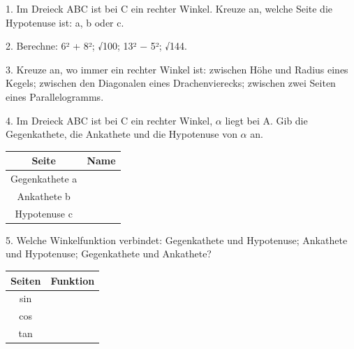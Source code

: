 \documentclass[11pt]{article}
\begin{document}
\pfheftstil
{}
\pfrueckblick
\begin{pfaufg}{}{1.}{}
Im Dreieck ABC ist bei C ein rechter Winkel. Kreuze an, welche Seite die Hypotenuse ist: a, b oder c.
\end{pfaufg}
\begin{pfaufg}{}{2.}{}
Berechne: 6² + 8²; √100; 13² $-$ 5²; √144.
\end{pfaufg}
\begin{pfaufg}{}{3.}{}
Kreuze an, wo immer ein rechter Winkel ist: zwischen Höhe und Radius eines Kegels; zwischen den Diagonalen eines Drachenvierecks; zwischen zwei Seiten eines Parallelogramms.
\end{pfaufg}
\begin{pfaufg}{}{4.}{}
Im Dreieck ABC ist bei C ein rechter Winkel, $\alpha$ liegt bei A. Gib die Gegenkathete, die Ankathete und die Hypotenuse von $\alpha$ an.
\par\smallskip\noindent \begingroup\renewcommand{\arraystretch}{1.3}\begin{tabular}{|c|c|}\hline \textbf{Seite} & \textbf{Name} \\ \hline Gegenkathete a & \rule{0pt}{3ex}\hspace{1.6cm} \\ \hline Ankathete b & \rule{0pt}{3ex}\hspace{1.6cm} \\ \hline Hypotenuse c & \rule{0pt}{3ex}\hspace{1.6cm} \\ \hline\end{tabular}\endgroup\par
{}
\end{pfaufg}
\begin{pfaufg}{}{5.}{}
Welche Winkelfunktion verbindet: Gegenkathete und Hypotenuse; Ankathete und Hypotenuse; Gegenkathete und Ankathete?
\par\smallskip\noindent \begingroup\renewcommand{\arraystretch}{1.3}\begin{tabular}{|c|c|}\hline \textbf{Seiten} & \textbf{Funktion} \\ \hline sin & \rule{0pt}{3ex}\hspace{1.6cm} \\ \hline cos & \rule{0pt}{3ex}\hspace{1.6cm} \\ \hline tan & \rule{0pt}{3ex}\hspace{1.6cm} \\ \hline\end{tabular}\endgroup\par
{}
\end{pfaufg}
\end{document}
